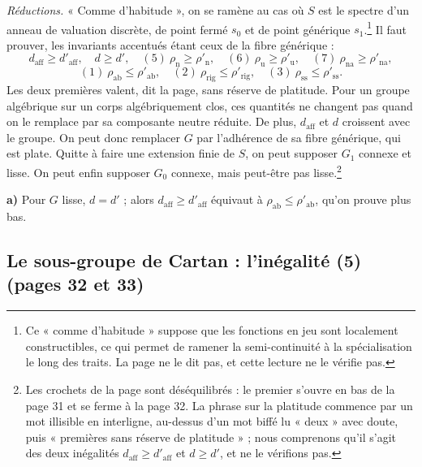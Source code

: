 \documentclass[11pt,a4paper]{article}
\begin{document}
\emph{Réductions.} « Comme d'habitude », on se ramène au cas où $S$ est le
spectre d'un anneau de valuation discrète, de point fermé $s_{0}$ et de point
générique $s_{1}$.\footnote{Ce « comme d'habitude » suppose que les fonctions
en jeu sont localement constructibles, ce qui permet de ramener la
semi-continuité à la spécialisation le long des traits. La page ne le dit
pas, et cette lecture ne le vérifie pas.} Il faut prouver, les invariants
accentués étant ceux de la fibre générique :
\[
  d_{\mathrm{aff}} \geqslant d'_{\mathrm{aff}}, \quad d \geqslant d', \quad
  \mathrm{(5)}\ \rho_{\mathrm{n}} \geqslant \rho'_{\mathrm{n}}, \quad
  \mathrm{(6)}\ \rho_{\mathrm{u}} \geqslant \rho'_{\mathrm{u}}, \quad
  \mathrm{(7)}\ \rho_{\mathrm{na}} \geqslant \rho'_{\mathrm{na}},
\]
\[
  \mathrm{(1)}\ \rho_{\mathrm{ab}} \leqslant \rho'_{\mathrm{ab}}, \quad
  \mathrm{(2)}\ \rho_{\mathrm{rig}} \leqslant \rho'_{\mathrm{rig}}, \quad
  \mathrm{(3)}\ \rho_{\mathrm{ss}} \leqslant \rho'_{\mathrm{ss}} .
\]
Les deux premières valent, dit la page, sans réserve de platitude. Pour un groupe
algébrique sur un corps algébriquement clos, ces quantités ne changent pas
quand on le remplace par sa composante neutre réduite. De plus, $d_{\mathrm{aff}}$ et $d$ croissent avec
le groupe. On peut donc remplacer $G$ par l'adhérence de sa fibre générique,
qui est plate. Quitte à faire une extension finie de $S$, on peut supposer
$G_{1}$ connexe et lisse. On peut enfin supposer $G_{0}$ connexe, mais
peut-être pas lisse.\footnote{Les crochets de la page sont déséquilibrés : le
premier s'ouvre en bas de la page 31 et se ferme à la page 32. La phrase sur
la platitude commence par un mot illisible en interligne, au-dessus d'un mot
biffé lu « deux » avec doute, puis « premières sans réserve de platitude » ;
nous comprenons qu'il s'agit des deux inégalités $d_{\mathrm{aff}} \geqslant
d'_{\mathrm{aff}}$ et $d \geqslant d'$, et ne le vérifions pas.}

\textbf{a)} Pour $G$ lisse, $d = d'$ ; alors $d_{\mathrm{aff}} \geqslant
d'_{\mathrm{aff}}$ équivaut à $\rho_{\mathrm{ab}} \leqslant
\rho'_{\mathrm{ab}}$, qu'on prouve plus bas.

\subsection*{Le sous-groupe de Cartan : l'inégalité (5) (pages 32 et 33)}
\end{document}
